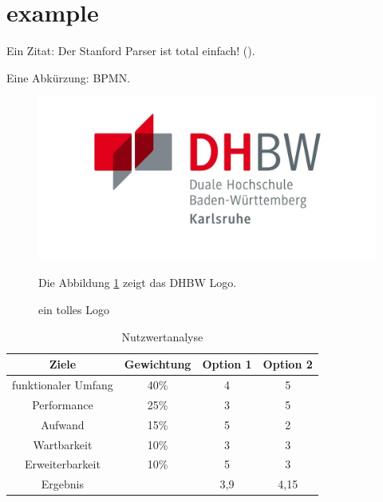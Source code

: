 \section{example}
Ein Zitat: Der Stanford Parser ist total einfach! (\cite[vgl.][274]{A1}).\par 
Eine Abkürzung: \ac{BPMN}.\par

\begin{figure}[H]
\noindent\includegraphics[width=\linewidth,height=\textheight,
keepaspectratio]{pictures/dhbw_logo.png}
\caption{ein tolles Logo}
\label{fig:DHBW}

Die Abbildung \ref{fig:DHBW} zeigt das DHBW Logo.
\end{figure}

\begin{table}[h!]
  \centering
  \begin{tabular}{cccc}
    \toprule
    Ziele & Gewichtung & Option 1 & Option 2\\
    \midrule
	funktionaler Umfang  	& 40\% & 4 & 5 \\    
	Performance 	& 25\% & 3 & 5 \\    
    Aufwand 		& 15\% & 5 & 2 \\
    Wartbarkeit 	& 10\% & 3 & 3 \\
    Erweiterbarkeit & 10\% & 5 & 3 \\
    \midrule
    Ergebnis 		& 	   & 3,9 & 4,15 \\
    \bottomrule
  \end{tabular}
  \caption{Nutzwertanalyse}
  \label{tab:table1}
\end{table}
